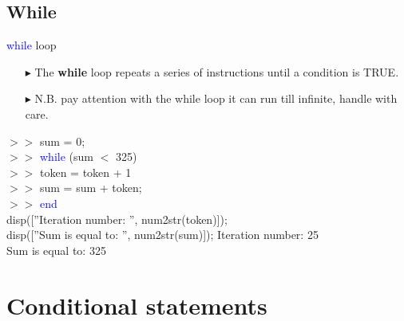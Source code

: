 \documentclass[xcolor={dvipsnames,rgb}, aspectratio=169]{beamer}
\begin{document}
\subsection{While}
\begin{frame}{\textcolor{blue}{while} loop}
    \vspace{-10pt}
    \begin{itemize}
        \item[$\blacktriangleright$] The \textbf{while} loop repeats a series of instructions
              \alert{until a condition is TRUE}.
        \item[$\blacktriangleright$] N.B. pay attention with the while loop it can run till
              infinite, \alert{handle with care}.
    \end{itemize}
    \begin{tcolorbox}[colback=white,colframe=bluepoli]
        $>>$ sum = 0; \\
        $>>$ \textcolor{blue}{while} (sum $<$ 325)\\
        $>>$ \hspace{1em}token = token + 1\\
        $>>$ \hspace{1em}sum = sum + token; \\
        $>>$ \textcolor{blue}{end}\\
        disp([''Iteration number: '', num2str(token)]); \\
        disp([''Sum is equal to:  '', num2str(sum)]);
        \tcblower
        Iteration number: 25 \\
        Sum is equal to: 325
    \end{tcolorbox}
\end{frame}

\section{Conditional statements}
\end{document}
